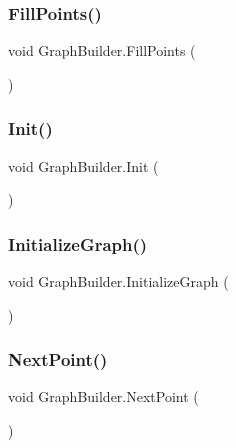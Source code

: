 \subsubsection{\texorpdfstring{Fill\+Points()}{FillPoints()}}
{\footnotesize\ttfamily void Graph\+Builder.\+Fill\+Points (\begin{DoxyParamCaption}{ }\end{DoxyParamCaption})}

\mbox{\label{class_graph_builder_aa6d73ad673971862998c257818424b15}} 
\subsubsection{\texorpdfstring{Init()}{Init()}}
{\footnotesize\ttfamily void Graph\+Builder.\+Init (\begin{DoxyParamCaption}{ }\end{DoxyParamCaption})}

\mbox{\label{class_graph_builder_ae9977fd7ab38bdc105ffef8898e1aa99}} 
\subsubsection{\texorpdfstring{Initialize\+Graph()}{InitializeGraph()}}
{\footnotesize\ttfamily void Graph\+Builder.\+Initialize\+Graph (\begin{DoxyParamCaption}{ }\end{DoxyParamCaption})}

\mbox{\label{class_graph_builder_a45ab6fb54d2778b4c9b3c02f5b8aaa92}} 
\subsubsection{\texorpdfstring{Next\+Point()}{NextPoint()}}
{\footnotesize\ttfamily void Graph\+Builder.\+Next\+Point (\begin{DoxyParamCaption}{ }\end{DoxyParamCaption})}

